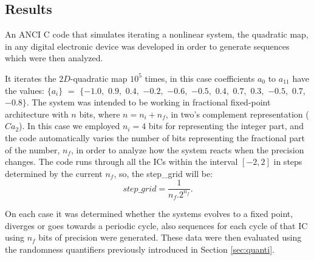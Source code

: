 \subsection{Results}
\label{sec:results}

An ANCI C code that simulates iterating a nonlinear system, the quadratic map, in any  digital electronic device was developed in order to generate sequences which were then analyzed.

It iterates the $2D$-quadratic map $10^5$ times, in this case coefficients $a_0$ to $a_{11}$ have the values: $\{a_i\}$ $=$ $\{-1.0,$ $0.9,$ $0.4,$ $-0.2,$ $-0.6,$ $-0.5,$ $0.4,$ $0.7,$ $0.3,$ $-0.5,$ $0.7,$ $-0.8\}$.
The system was intended to be working in fractional fixed-point architecture with $n$ bits, where $n=n_i+n_f$, in two's complement representation ($Ca_2$).
In this case we employed $n_i=4$ bits for representing the integer part, and the code automatically varies the number of bits representing the fractional part of the number, $n_f$, in order to analyze how the system reacts when the precision changes.
The code runs through all the ICs within the interval $[-2,2]$ in steps determined by the current $n_f$, so, the step\_grid will be:
%
\begin{equation}
step\_grid=\frac{1}{n_f.2^{n_f}}.
\end{equation}

On each case it was determined whether the systems evolves to a fixed point, diverges or goes towards a periodic cycle, also sequences for each cycle of that IC using $n_f$ bits of precision were generated.
These data were then evaluated using the randomness quantifiers previously introduced in Section \ref{sec:quanti}. 

